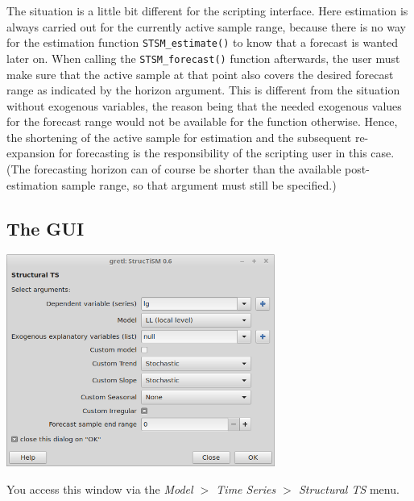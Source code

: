 \documentclass[a4paper,10pt]{article}
\begin{document}
The situation is a little bit different for the scripting interface. Here
estimation is always carried out for the currently active sample range,
because there is no way for the estimation function \texttt{STSM\_estimate()}
to know that a forecast is wanted later on. When calling the 
\texttt{STSM\_forecast()} function afterwards, the user must make sure that
the active sample at that point also covers the desired forecast range 
as indicated by the horizon argument. This is different from the situation
without exogenous variables, the reason being that the needed exogenous values
for the forecast range would not be available for the function otherwise.
Hence, the shortening of the active sample for estimation and the subsequent 
re-expansion for forecasting is the responsibility of the scripting user 
in this case. (The forecasting horizon can of course be shorter than the 
available post-estimation sample range, so that argument must still be 
specified.)


\subsection{The GUI}
\begin{center}
\includegraphics[width=0.66\textwidth]{GUI.png}
\end{center}

You access this window via the \emph{Model $>$ Time Series  $>$
  Structural TS} menu.
\end{document}
